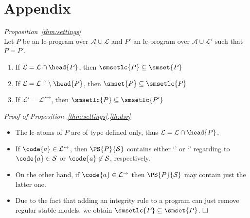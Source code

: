 \newpage
\section*{Appendix}
\noindent\textit{Proposition~\ref{thm:settings}} \\
  \noindent
  Let $P$ be an lc-program over $\mathcal{A}\cup\mathcal{L}$
  and $P'$   an lc-program over $\mathcal{A}\cup\mathcal{L}'$
  such that $P=P'$.
  \begin{enumerate}
  \item \label{th:dsr} %
    If
    \(
    \mathcal{L}=\mathcal{L}\cap\head{P}
    \),
    then
    \(
    \smsetlc{P}\subseteq\smset{P}
    \)
  \item \label{th:rsen} %
    If
    \(
    \mathcal{L}=\mathcal{L}^\rightarrow\setminus\head{P}
    \),
    then
    \(
    \smset{P}\subseteq\smsetlc{P}
    \)
  \item \label{th:ssn} %
    If
    \(
    \mathcal{L}'=\mathcal{L}'^\rightarrow
    \),
    then
    \(
    \smsetlc{P}\subseteq\smsetlc{P'}
    \)
  \end{enumerate}
  
\noindent\textit{Proof of Proposition~\ref{thm:settings}.\ref{th:dsr}}  
    \begin{itemize}
     \item The lc-atoms of $P$ are of type defined only, thus 
        \(
        \mathcal{L}=
        \mathcal{L}\cap\head{P}
        \). 
     \item If 
        \(
        \code{a}\in\mathcal{L}^\leftrightarrow
        \), then 
        $\PS{P}{\mathcal{S}}$ contains either 
        `' or `' 
        regarding to 
        $\code{a}\in\mathcal{S}$ or 
        $\code{a}\not\in\mathcal{S}$, respectively.  
     \item On the other hand, if 
        \(
        \code{a}\in\mathcal{L}^\rightarrow
        \) then 
        $\PS{P}{\mathcal{S}}$ may contain just the latter one. 
     \item Due to the fact that adding an integrity rule to a program 
        can just remove regular stable models, 
        we obtain 
        \(
        \smsetlc{P}\subseteq\smset{P}
        \). 
        $\hfill\square$
    \end{itemize}
  

